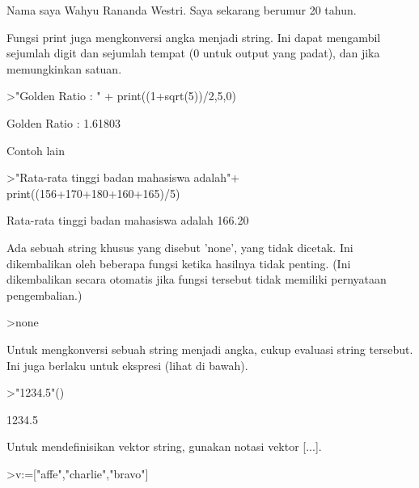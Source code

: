 \documentclass[a4paper,10pt]{article}
\begin{document}
\begin{eulernotebook}
\begin{eulerprompt}
\end{eulerprompt}
\begin{euleroutput}
  Nama saya Wahyu Rananda Westri. Saya sekarang berumur 20 tahun.
\end{euleroutput}
\begin{eulercomment}
Fungsi print juga mengkonversi angka menjadi string. Ini dapat
mengambil sejumlah digit dan sejumlah tempat (0 untuk output yang
padat), dan jika memungkinkan satuan.
\end{eulercomment}
\begin{eulerprompt}
>"Golden Ratio : " + print((1+sqrt(5))/2,5,0)
\end{eulerprompt}
\begin{euleroutput}
  Golden Ratio : 1.61803
\end{euleroutput}
\begin{eulercomment}
Contoh lain
\end{eulercomment}
\begin{eulerprompt}
>"Rata-rata tinggi badan mahasiswa adalah"+ print((156+170+180+160+165)/5)
\end{eulerprompt}
\begin{euleroutput}
  Rata-rata tinggi badan mahasiswa adalah    166.20
\end{euleroutput}
\begin{eulercomment}
Ada sebuah string khusus yang disebut 'none', yang tidak dicetak. Ini
dikembalikan oleh beberapa fungsi ketika hasilnya tidak penting. (Ini
dikembalikan secara otomatis jika fungsi tersebut tidak memiliki
pernyataan pengembalian.)
\end{eulercomment}
\begin{eulerprompt}
>none
\end{eulerprompt}
\begin{eulercomment}
Untuk mengkonversi sebuah string menjadi angka, cukup evaluasi string
tersebut. Ini juga berlaku untuk ekspresi (lihat di bawah).
\end{eulercomment}
\begin{eulerprompt}
>"1234.5"()
\end{eulerprompt}
\begin{euleroutput}
  1234.5
\end{euleroutput}
\begin{eulercomment}
Untuk mendefinisikan vektor string, gunakan notasi vektor [...].
\end{eulercomment}
\begin{eulerprompt}
>v:=["affe","charlie","bravo"]
\end{eulerprompt}

\end{eulernotebook}
\end{document}
